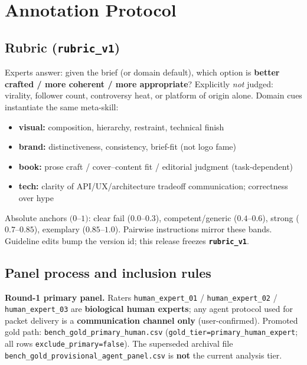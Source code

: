 \documentclass[11pt,a4paper]{article}
\begin{document}
\section{Annotation Protocol}
\label{sec:annotation}

\subsection{Rubric (\texttt{rubric\_v1})}

Experts answer: given the brief (or domain default), which option is \textbf{better crafted / more coherent / more appropriate}? Explicitly \emph{not} judged: virality, follower count, controversy heat, or platform of origin alone. Domain cues instantiate the same meta-skill:

\begin{itemize}[leftmargin=*,itemsep=2pt]
  \item \textbf{visual:} composition, hierarchy, restraint, technical finish
  \item \textbf{brand:} distinctiveness, consistency, brief-fit (not logo fame)
  \item \textbf{book:} prose craft / cover--content fit / editorial judgment (task-dependent)
  \item \textbf{tech:} clarity of API/UX/architecture tradeoff communication; correctness over hype
\end{itemize}

Absolute anchors $(0$--$1)$: clear fail ($0.0$--$0.3$), competent/generic ($0.4$--$0.6$), strong ($0.7$--$0.85$), exemplary ($0.85$--$1.0$). Pairwise instructions mirror these bands. Guideline edits bump the version id; this release freezes \textbf{\texttt{rubric\_v1}}.

\subsection{Panel process and inclusion rules}

\textbf{Round-1 primary panel.} Raters \texttt{human\_expert\_01} / \texttt{human\_expert\_02} / \texttt{human\_expert\_03} are \textbf{biological human experts}; any agent protocol used for packet delivery is a \textbf{communication channel only} (user-confirmed). Promoted gold path: \texttt{bench\_gold\_primary\_human.csv} (\texttt{gold\_tier=primary\_human\_expert}; all rows \texttt{exclude\_primary=false}). The superseded archival file \texttt{bench\_gold\_provisional\_agent\_panel.csv} is \textbf{not} the current analysis tier.
\end{document}

